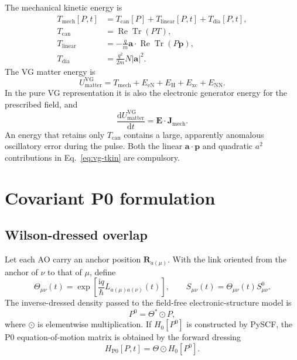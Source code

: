 \documentclass[11pt]{article}
\newcommand{\ii}{\mathrm{i}}
\newcommand{\dd}{\mathrm{d}}
\newcommand{\Pzero}{\mathrm{P0}}
\newcommand{\ReTr}{\operatorname{Re}\operatorname{Tr}}
\newcommand{\vect}[1]{\bm{#1}}
\begin{document}
The mechanical kinetic energy is
\begin{align}
 T_{\mathrm{mech}}[P,t]
 &=T_{\mathrm{can}}[P]+T_{\mathrm{linear}}[P,t]
   +T_{\mathrm{dia}}[P,t],\label{eq:vg-tkin}\\
 T_{\mathrm{can}}&=\ReTr(PT),\nonumber\\
 T_{\mathrm{linear}}
   &=-\frac q m\vect a\cdot\ReTr(P\vect p),\nonumber\\
 T_{\mathrm{dia}}
   &=\frac{q^2}{2m}N|\vect a|^2.\nonumber
\end{align}
The VG matter energy is
\begin{equation}
 U_{\mathrm{matter}}^{\mathrm{VG}}
 =T_{\mathrm{mech}}+E_{\mathrm{eN}}+E_{\mathrm H}
  +E_{\mathrm{xc}}+E_{\mathrm{NN}}.
 \label{eq:vg-energy}
\end{equation}
In the pure VG representation it is also the electronic generator energy for
the prescribed field, and
\begin{equation}
 \frac{\dd U_{\mathrm{matter}}^{\mathrm{VG}}}{\dd t}
 =\vect E\cdot\vect J_{\mathrm{mech}}.
 \label{eq:vg-work}
\end{equation}
An energy that retains only \(T_{\mathrm{can}}\) contains a large,
apparently anomalous oscillatory error during the pulse. Both the linear
\(\vect a\cdot\vect p\) and quadratic \(a^2\) contributions in
Eq.~\eqref{eq:vg-tkin} are compulsory.

\section{Covariant P0 formulation}

\subsection{Wilson-dressed overlap}

Let each AO carry an anchor position \(\vect R_{a(\mu)}\). With the link
oriented from the anchor of \(\nu\) to that of \(\mu\), define
\begin{equation}
 \Theta_{\mu\nu}(t)
 =\exp\!\left[\frac{\ii q}{\hbar}
   L_{a(\mu)a(\nu)}(t)\right],
 \qquad
 S_{\mu\nu}(t)=\Theta_{\mu\nu}(t)S^0_{\mu\nu}.
 \label{eq:p0-overlap}
\end{equation}
The inverse-dressed density passed to the field-free electronic-structure
model is
\begin{equation}
 P^0=\Theta^*\odot P,
 \label{eq:inverse-density}
\end{equation}
where \(\odot\) is elementwise multiplication. If
\(H_0[P^0]\) is constructed by PySCF, the P0 equation-of-motion matrix is
obtained by the forward dressing
\begin{equation}
 H_{\Pzero}[P,t]=\Theta\odot H_0[P^0].
 \label{eq:p0-hamiltonian}
\end{equation}
\end{document}
